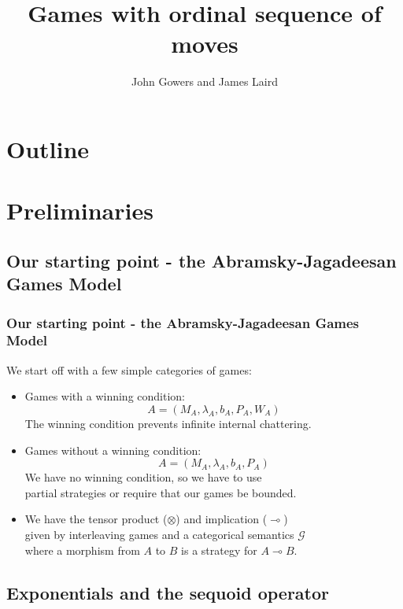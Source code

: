 \documentclass{beamer}
\title{Games with ordinal sequence of moves}
\author{John Gowers and James Laird}
\newcommand{\tensor}{\otimes}
\renewcommand{\implies}{\multimap}
\newcommand{\G}{\mathcal G}
\begin{document}
\begin{frame}
  \titlepage
\end{frame}

\section*{Outline}
\begin{frame}
  \tableofcontents
\end{frame}

\section{Preliminaries}

\subsection{Our starting point - the Abramsky-Jagadeesan Games Model}

\begin{frame}
  \frametitle{Our starting point - the Abramsky-Jagadeesan Games Model}

  We start off with a few simple categories of games:

  \begin{itemize}
    \item Games with a winning condition:
      \[
        A=(M_A,\lambda_A,b_A,P_A,W_A)
        \]
      The winning condition prevents infinite internal chattering.
    \item Games without a winning condition:
      \[
        A=(M_A,\lambda_A,b_A,P_A)
        \]
      We have no winning condition, so we have to use \\
      partial strategies or require that our games be bounded.
    \item We have the tensor product ($\tensor$) and implication ($\implies$) \\
      given by interleaving games and a categorical semantics $\G$\\
      where a morphism from $A$ to $B$ is a strategy for $A\implies B$.
  \end{itemize}

\end{frame}

\subsection{Exponentials and the sequoid operator}
\end{document}
